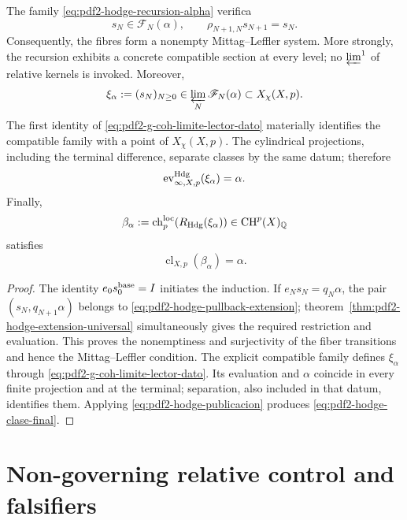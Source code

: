 \begin{theorem}
\label{thm:pdf2-hodge-completitud-final}
The family \eqref{eq:pdf2-hodge-recursion-alpha} verifica
\[
 s_N\in\mathscr F_N(\alpha),
 \qquad \rho_{N+1,N}s_{N+1}=s_N.
\]
Consequently, the fibres form a nonempty Mittag--Leffler system. More
strongly, the recursion exhibits a concrete compatible section at every
level; no \(\varprojlim^1\) of relative kernels is invoked. Moreover,
\begin{equation}\label{eq:pdf2-hodge-xi-alpha}
 \xi_\alpha:=(s_N)_{N\ge0}
 \in\varprojlim_N\mathscr F_N(\alpha)\subset X_\chi(X,p).
\end{equation}
The first identity of \eqref{eq:pdf2-g-coh-limite-lector-dato} materially identifies
the compatible family with a point of $X_\chi(X,p)$. The
cylindrical projections, including the terminal difference, separate classes by
the same datum; therefore
\begin{equation}\label{eq:pdf2-hodge-evaluacion-alpha}
 \operatorname{ev}^{\rm Hdg}_{\infty,X,p}(\xi_\alpha)=\alpha.
\end{equation}
Finally,
\begin{equation}\label{eq:pdf2-hodge-beta}
 \beta_\alpha:=\operatorname{ch}^{\rm loc}_p
 (R_{\rm Hdg}(\xi_\alpha))\in\operatorname{CH}^p(X)_{\mathbb Q}
\end{equation}
satisfies
\begin{equation}\label{eq:pdf2-hodge-clase-final}
 \operatorname{cl}_{X,p}(\beta_\alpha)=\alpha.
\end{equation}
\end{theorem}

\begin{proof}
The identity $e_0s_0^{\rm base}=I$ initiates the induction. If $e_Ns_N=q_N\alpha$, the pair $(s_N,q_{N+1}\alpha)$ belongs to \eqref{eq:pdf2-hodge-pullback-extension}; theorem~\ref{thm:pdf2-hodge-extension-universal} simultaneously gives the required restriction and evaluation. This proves the nonemptiness and surjectivity of the fiber transitions and hence the Mittag--Leffler condition. The explicit compatible family defines $\xi_\alpha$ through \eqref{eq:pdf2-g-coh-limite-lector-dato}. Its evaluation and $\alpha$ coincide in every finite projection and at the terminal; separation, also included in that datum, identifies them. Applying \eqref{eq:pdf2-hodge-publicacion} produces \eqref{eq:pdf2-hodge-clase-final}.
\end{proof}

\section{Non-governing relative control and falsifiers}


